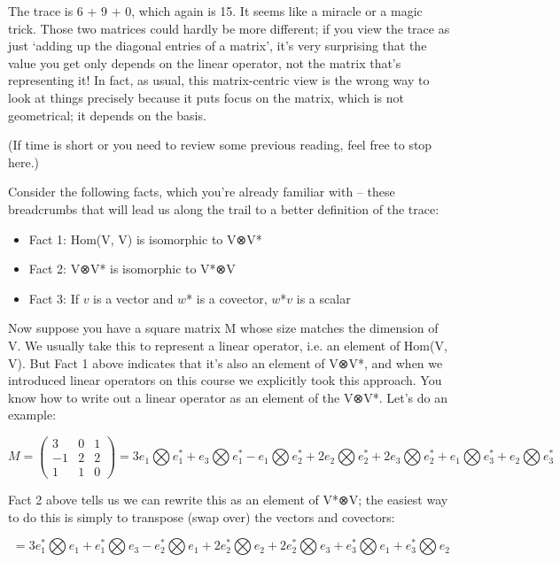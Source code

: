 \documentclass[oneside,english]{amsbook}
\numberwithin{section}{chapter}
\theoremstyle{plain}
\theoremstyle{definition}
\begin{document}
The trace is 6 + 9 + 0, which again is 15. It seems like a miracle or a
magic trick. Those two matrices could hardly be more different; if you
view the trace as just `adding up the diagonal entries of a matrix',
it's very surprising that the value you get only depends on the linear
operator, not the matrix that's representing it! In fact, as usual, this
matrix-centric view is the wrong way to look at things precisely because
it puts focus on the matrix, which is not geometrical; it depends on the
basis.

(If time is short or you need to review some previous reading, feel free
to stop here.)

Consider the following facts, which you're already familiar with --
these breadcrumbs that will lead us along the trail to a better
definition of the trace:

\begin{itemize}
	\item
	Fact 1: Hom(V, V) is isomorphic to V⊗V*
	\item
	Fact 2: V⊗V* is isomorphic to V*⊗V
	\item
	Fact 3: If $v$ is a vector and $w$* is a covector, $w$*$v$
	is a scalar
\end{itemize}

Now suppose you have a square matrix M whose size matches the dimension
of V. We usually take this to represent a linear operator, i.e. an
element of Hom(V, V). But Fact 1 above indicates that it's also an
element of V⊗V*, and when we introduced linear operators on this course
we explicitly took this approach. You know how to write out a linear
operator as an element of the V⊗V*. Let's do an example:

\[{M = \begin{pmatrix}
		3 & 0 & 1 \\
		- 1 & 2 & 2 \\
		1 & 1 & 0
	\end{pmatrix}
}{= 3e_{1}\bigotimes e_{1}^{*} + e_{3}\bigotimes e_{1}^{*} - e_{1}\bigotimes e_{2}^{*} + 2e_{2}\bigotimes e_{2}^{*} + 2e_{3}\bigotimes e_{2}^{*} + e_{1}\bigotimes e_{3}^{*} + e_{2}\bigotimes e_{3}^{*}}\]

Fact 2 above tells us we can rewrite this as an element of V*⊗V; the
easiest way to do this is simply to transpose (swap over) the vectors
and covectors:

\[= 3e_{1}^{*}\bigotimes e_{1} + e_{1}^{*}\bigotimes e_{3} - e_{2}^{*}\bigotimes e_{1} + 2e_{2}^{*}\bigotimes e_{2} + 2e_{2}^{*}\bigotimes e_{3} + e_{3}^{*}\bigotimes e_{1} + e_{3}^{*}\bigotimes e_{2}\]
\end{document}
